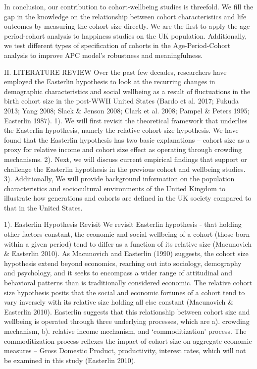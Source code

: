 In conclusion, our contribution to cohort-wellbeing studies is threefold. We fill the gap in the knowledge on the relationship between cohort characteristics and life outcomes by measuring the cohort size directly. We are the first to apply the age-period-cohort analysis to happiness studies on the UK population. Additionally, we test different types of specification of cohorts in the Age-Period-Cohort analysis to improve APC model’s robustness and meaningfulness.

II. LITERATURE REVIEW
Over the past few decades, researchers have employed the Easterlin hypothesis to look at the recurring changes in demographic characteristics and social wellbeing as a result of fluctuations in the birth cohort size in the post-WWII United States (Bardo et al. 2017; Fukuda 2013; Yang 2008; Slack & Jenson 2008; Clark et al. 2008; Pampel & Peters 1995; Easterlin 1987). 1). We will first revisit the theoretical framework that underlies the Easterlin hypothesis, namely the relative cohort size hypothesis. We have found that the Easterlin hypothesis has two basic explanations – cohort size as a proxy for relative income and cohort size effect as operating through crowding mechanisms. 2). Next, we will discuss current empirical findings that support or challenge the Easterlin hypothesis in the previous cohort and wellbeing studies. 3). Additionally, We will provide background information on the population characteristics and sociocultural environments of the United Kingdom to illustrate how generations and cohorts are defined in the UK society compared to that in the United States.

1). Easterlin Hypothesis Revisit
We revisit Easterlin hypothesis - that holding other factors constant, the economic and social wellbeing of a cohort (those born within a given period) tend to differ as a function of its relative size (Macunovich & Easterlin 2010). As Macunovich and Easterlin (1990) suggests, the cohort size hypothesis extend beyond economics, reaching out into sociology, demography and psychology, and it seeks to encompass a wider range of attitudinal and behavioral patterns than is traditionally considered economic. The relative cohort size hypothesis posits that the social and economic fortunes of a cohort tend to vary inversely with its relative size holding all else constant (Macunovich & Easterlin 2010). Easterlin suggests that this relationship between cohort size and wellbeing is operated through three underlying processes, which are a). crowding mechanism, b). relative income mechanism, and ‘commoditization’ process. The commoditization process reflexes the impact of cohort size on aggregate economic measures – Gross Domestic Product, productivity, interest rates, which will not be examined in this study (Easterlin 2010). 

